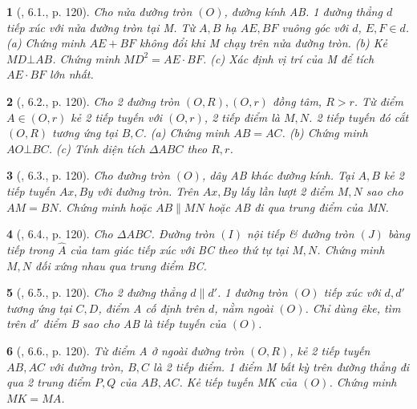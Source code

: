 \documentclass{article}
\newtheorem{baitoan}{}
\begin{document}
\begin{baitoan}[\cite{Binh_boi_duong_Toan_9_tap_1}, 6.1., p. 120]
	Cho nửa đường tròn $(O)$, đường kính AB. 1 đường thẳng $d$ tiếp xúc với nửa đường tròn tại M. Từ $A,B$ hạ $AE,BF$ vuông góc với $d$, $E,F\in d$. (a) Chứng minh $AE + BF$ không đổi khi M chạy trên nửa đường tròn. (b) Kẻ $MD\bot AB$. Chứng minh $MD^2 = AE\cdot BF$. (c) Xác định vị trí của M để tích $AE\cdot BF$ lớn nhất.
\end{baitoan}

\begin{baitoan}[\cite{Binh_boi_duong_Toan_9_tap_1}, 6.2., p. 120]
	Cho 2 đường tròn $(O,R),(O,r)$ đồng tâm, $R > r$. Từ điểm $A\in(O,r)$ kẻ 2 tiếp tuyến với $(O,r)$, 2 tiếp điểm là $M,N$. 2 tiếp tuyến đó cắt $(O,R)$ tương ứng tại $B,C$. (a) Chứng minh $AB = AC$. (b) Chứng minh $AO\bot BC$. (c) Tính diện tích $\Delta ABC$ theo $R,r$.
\end{baitoan}

\begin{baitoan}[\cite{Binh_boi_duong_Toan_9_tap_1}, 6.3., p. 120]
	Cho đường tròn $(O)$, dây AB khác đường kính. Tại $A,B$ kẻ 2 tiếp tuyến $Ax,By$ với đường tròn. Trên $Ax,By$ lấy lần lượt 2 điểm $M,N$ sao cho $AM = BN$. Chứng minh hoặc $AB\parallel MN$ hoặc AB đi qua trung điểm của MN.
\end{baitoan}

\begin{baitoan}[\cite{Binh_boi_duong_Toan_9_tap_1}, 6.4., p. 120]
	Cho $\Delta ABC$. Đường tròn $(I)$ nội tiếp \& đường tròn $(J)$ bàng tiếp trong $\widehat{A}$ của tam giác tiếp xúc với BC theo thứ tự tại $M,N$. Chứng minh $M,N$ đối xứng nhau qua trung điểm BC.
\end{baitoan}

\begin{baitoan}[\cite{Binh_boi_duong_Toan_9_tap_1}, 6.5., p. 120]
	Cho 2 đường thẳng $d\parallel d'$. 1 đường tròn $(O)$ tiếp xúc với $d,d'$ tương ứng tại $C,D$, điểm A cố định trên $d$, nằm ngoài $(O)$. Chỉ dùng êke, tìm trên $d'$ điểm B sao cho AB là tiếp tuyến của $(O)$.
\end{baitoan}

\begin{baitoan}[\cite{Binh_boi_duong_Toan_9_tap_1}, 6.6., p. 120]
	Từ điểm A ở ngoài đường tròn $(O,R)$, kẻ 2 tiếp tuyến $AB,AC$ với đường tròn, $B,C$ là 2 tiếp điểm. 1 điểm M bất kỳ trên đường thẳng đi qua 2 trung điểm $P,Q$ của $AB,AC$. Kẻ tiếp tuyến MK của $(O)$. Chứng minh $MK = MA$.
\end{baitoan}
\end{document}
